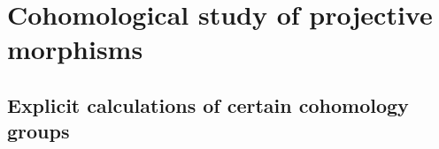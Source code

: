 \section{Cohomological study of projective morphisms}
\label{section:III.2}


\subsection{Explicit calculations of certain cohomology groups}
\label{subsection:III.2.1}










